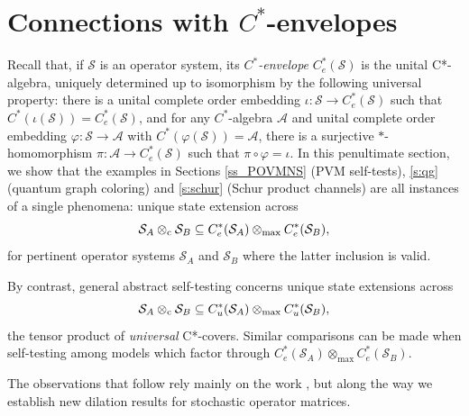 \documentclass[11pt]{amsart}
\theoremstyle{definition}
\newtheorem{remark}[theorem]{Remark}
\newcommand{\cl}[1]{\mathcal{#1}}
\newcommand{\mc}[1]{\mathcal{#1}}
\newcommand{\ten}{\otimes}
\newcommand{\vphi}{\varphi}
\begin{document}


\section{Connections with $C^*$-envelopes}\label{s_conncstarenv}


Recall that, if $\cl S$ is an operator system, 
its \textit{$C^*$-envelope} $C^*_e(\mc{S})$ is the unital C*-algebra, uniquely determined up to isomorphism by the following universal property: there is a unital complete order embedding $\iota:\cl{S}\to C^*_{e}(\cl{S})$ such that $C^*(\iota(\cl{S}))=C^*_{e}(\cl{S})$, and for any $C^*$-algebra 
$\cl A$ and unital complete order embedding $\vphi:\cl{S}\to \cl A$ with $C^*(\vphi(\cl{S})) = \cl A$, there is a surjective $*$-homomorphism $\pi : \cl A\to C^*_{e}(\cl{S})$ such that $\pi\circ\vphi=\iota$. 
In this penultimate section, we show that the examples in Sections \ref{ss_POVMNS} (PVM self-tests), \ref{s:qg} (quantum graph coloring) and \ref {s:schur} (Schur product channels) are all instances of a single phenomena: unique state extension across 
$$\mc{S}_A\ten_{\rm c} \mc{S}_B\subseteq C^*_e(\mc{S}_A)\ten_{\max} C^*_e(\mc{S}_B),$$
for pertinent operator systems $\mc{S}_A$ and $\mc{S}_B$ where the latter 
inclusion is valid. 

By contrast, general abstract self-testing concerns unique state extensions across
$$\mc{S}_A\ten_{\rm c} \mc{S}_B\subseteq C^*_u(\mc{S}_A)\ten_{\max} C^*_u(\mc{S}_B),$$
the tensor product of \textit{universal} C*-covers. 
Similar comparisons can be made when self-testing among models which factor through $C^*_e(\mc{S}_A)\ten_{\max} C^*_e(\mc{S}_B)$.

The observations that follow rely mainly on the work \cite{bks}, but along the way we establish new dilation results for stochastic operator matrices. 

\end{document}
